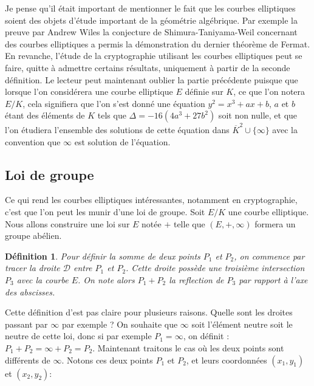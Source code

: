 \documentclass{article}
\theoremstyle{plain}%
\newtheorem{deff}[thm]{Définition}
\theoremstyle{definition}%
\newcommand{\ol}{\overline}
\begin{document}
Je pense qu'il était important de mentionner le fait que les courbes elliptiques soient des objets d'étude important de la géométrie algébrique. Par exemple la preuve par Andrew Wiles la conjecture de Shimura-Taniyama-Weil concernant des courbes elliptiques a permis la démonstration du dernier théorème de Fermat. En revanche, l'étude de la cryptographie utilisant les courbes elliptiques peut se faire, quitte à admettre certains résultats, uniquement à partir de la seconde définition. 
Le lecteur peut maintenant oublier la partie précédente puisque que lorsque l'on considérera une courbe elliptique $E$ définie sur $K$, ce que l'on notera $E/K$, cela signifiera que l'on s'est donné une équation $y^2 = x^3 + ax + b$, $a$ et $b$ étant des éléments de $K$ tels que $\Delta =-16(4a^3+ 27b^2)$ soit non nulle, et que l'on étudiera l'ensemble des solutions de cette équation dans $\ol K^2\cup \{\infty\}$ avec la convention que $\infty$ est solution de l'équation.


\subsection{Loi de groupe}

Ce qui rend les courbes elliptiques intéressantes, notamment en cryptographie, c'est que l'on peut les munir d'une loi de groupe. Soit $E/K$ une courbe elliptique. Nous allons construire une loi sur $E$ notée $+$ telle que $(E, +, \infty)$ formera un groupe abélien.


\begin{deff}
Pour définir la somme de deux points $P_1$ et $P_2$, on commence par tracer la droite $\mathcal D$ entre $P_1$ et $P_2$. Cette droite possède une troisième intersection $P_3$ avec la courbe $E$. On note alors $P_1 + P_2$ la reflection de $P_3$ par rapport à l'axe des abscisses.
\end{deff}

Cette définition d'est pas claire pour plusieurs raisons. Quelle sont les  droites passant par $\infty$ par exemple ? On souhaite que $\infty$ soit l'élément neutre soit le neutre de cette loi, donc si par exemple $P_1=\infty$, on définit : $P_1+P_2 = \infty+P_2 = P_2$.
Maintenant traitons le cas où les deux points sont différents de $\infty$. Notons ces deux points $P_1$ et $P_2$, et leurs coordonnées $(x_1, y_1)$ et $(x_2, y_2)$:
\end{document}
